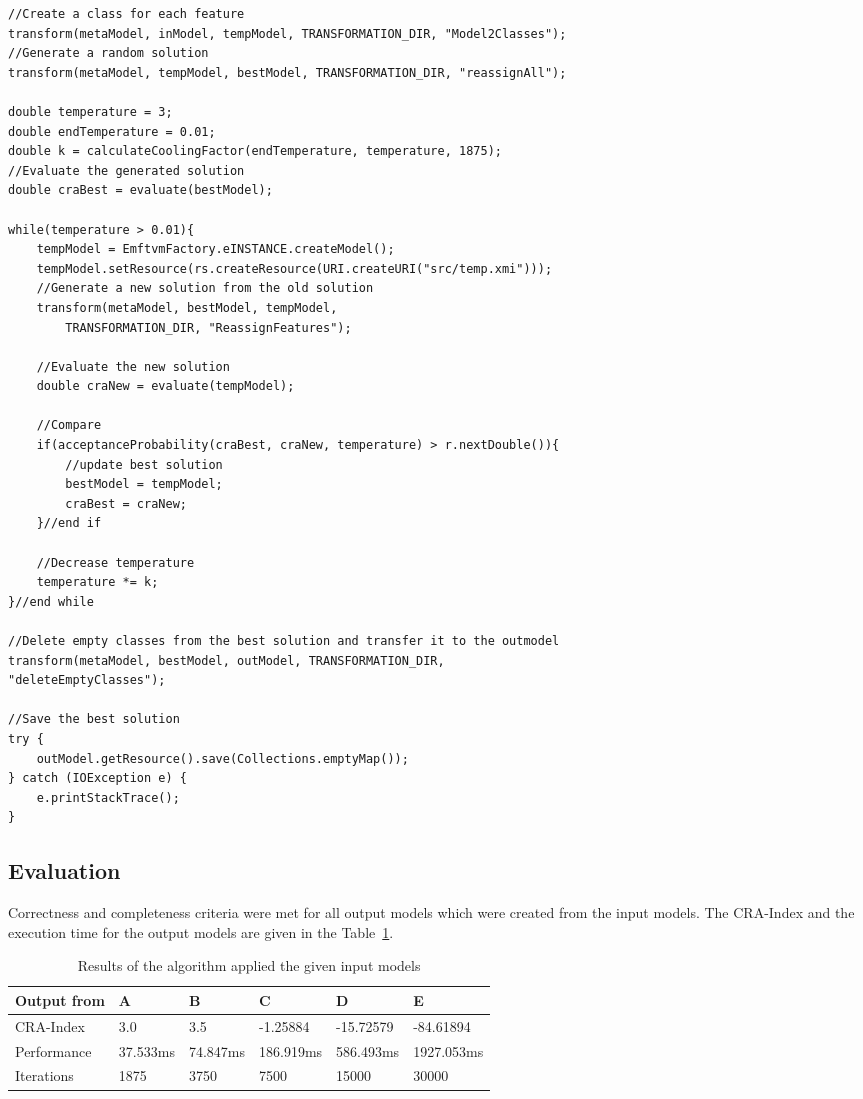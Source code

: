 \documentclass[a4paper]{article}
\begin{document}
\begin{lstlisting}
//Create a class for each feature
transform(metaModel, inModel, tempModel, TRANSFORMATION_DIR, "Model2Classes");
//Generate a random solution
transform(metaModel, tempModel, bestModel, TRANSFORMATION_DIR, "reassignAll");

double temperature = 3;
double endTemperature = 0.01;
double k = calculateCoolingFactor(endTemperature, temperature, 1875);
//Evaluate the generated solution
double craBest = evaluate(bestModel);

while(temperature > 0.01){
	tempModel = EmftvmFactory.eINSTANCE.createModel();
	tempModel.setResource(rs.createResource(URI.createURI("src/temp.xmi")));
	//Generate a new solution from the old solution
	transform(metaModel, bestModel, tempModel,
		TRANSFORMATION_DIR, "ReassignFeatures");

	//Evaluate the new solution
	double craNew = evaluate(tempModel);

	//Compare
	if(acceptanceProbability(craBest, craNew, temperature) > r.nextDouble()){
		//update best solution
		bestModel = tempModel;
		craBest = craNew;
	}//end if

	//Decrease temperature
	temperature *= k;
}//end while

//Delete empty classes from the best solution and transfer it to the outmodel
transform(metaModel, bestModel, outModel, TRANSFORMATION_DIR,
"deleteEmptyClasses");

//Save the best solution
try {
	outModel.getResource().save(Collections.emptyMap());
} catch (IOException e) {
	e.printStackTrace();
}
\end{lstlisting}

\subsection{Evaluation}

Correctness and completeness criteria were met for all output models which were created from the input models.
The CRA-Index and the execution time for the output models are given in the Table~\ref{tab:results}.

\begin{table}[h]
	\caption{Results of the algorithm applied the given input models}
	\label{tab:results}
\begin{center}
\begin{tabular}{|l|l|l|l|l|l|}
\hline
Output from & A & B & C & D & E\\
\hline
CRA-Index & 3.0 & 3.5 & -1.25884 & -15.72579 & -84.61894\\
\hline
Performance & 37.533ms & 74.847ms & 186.919ms & 586.493ms & 1927.053ms\\
\hline
Iterations & 1875 & 3750 & 7500 & 15000 & 30000\\
\hline
\end{tabular}
\end{center}
\end{table}

\nocite{*}

 

\end{document}
